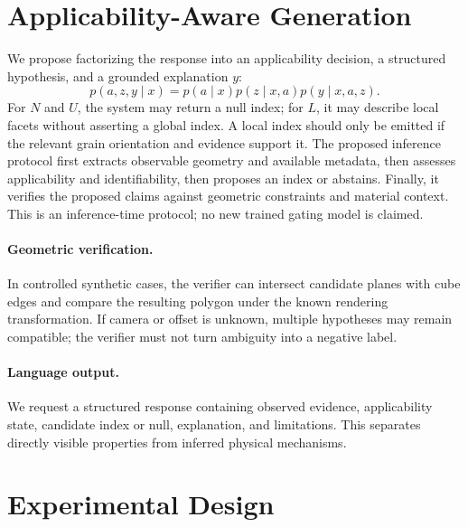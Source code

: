 \documentclass[11pt]{article}
\begin{document}
\section{Applicability-Aware Generation}
We propose factorizing the response into an applicability decision, a structured hypothesis, and a grounded explanation $y$:
\begin{equation}
 p(a,z,y\mid x)=p(a\mid x)p(z\mid x,a)p(y\mid x,a,z).
\end{equation}
For $N$ and $U$, the system may return a null index; for $L$, it may describe local facets without asserting a global index. A local index should only be emitted if the relevant grain orientation and evidence support it.
The proposed inference protocol first extracts observable geometry and available metadata, then assesses applicability and identifiability, then proposes an index or abstains. Finally, it verifies the proposed claims against geometric constraints and material context. This is an inference-time protocol; no new trained gating model is claimed.
\paragraph{Geometric verification.} In controlled synthetic cases, the verifier can intersect candidate planes with cube edges and compare the resulting polygon under the known rendering transformation. If camera or offset is unknown, multiple hypotheses may remain compatible; the verifier must not turn ambiguity into a negative label.
\paragraph{Language output.} We request a structured response containing observed evidence, applicability state, candidate index or null, explanation, and limitations. This separates directly visible properties from inferred physical mechanisms.
\section{Experimental Design}
\end{document}
